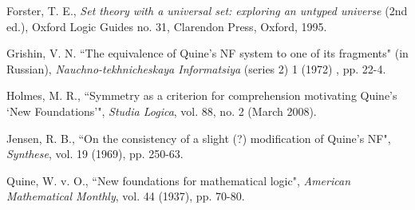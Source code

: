 \documentclass[12pt]{article}
\begin{document}
\begin{thebibliography}{99}

  Forster, T. E., {\em Set theory with a universal set:  exploring an untyped universe\/} (2nd ed.), Oxford Logic Guides no. 31, Clarendon Press, Oxford, 1995.

 Grishin, V. N. ``The equivalence of Quine's NF system to one of its fragments" (in Russian), {\em Nauchno-tekhnicheskaya Informatsiya\/} (series 2) 1 (1972) , pp. 22-4.

  Holmes, M. R.,   ``Symmetry  as  a  criterion  for  comprehension  motivating  Quine’s `New Foundations'", {\em Studia Logica\/}, vol.  88, no.  2 (March 2008).

 Jensen, R. B., ``On the consistency of a slight (?) modification of Quine's NF", {\em Synthese}, vol. 19 (1969), pp. 250-63.

 Quine, W. v. O., ``New foundations for mathematical logic", {\em American Mathematical Monthly\/}, vol. 44 (1937), pp. 70-80.
\end{thebibliography}
\end{document}
